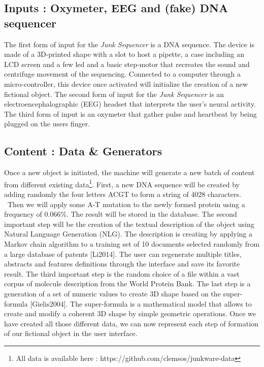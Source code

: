 \subsection[Inputs : Oxymeter, EEG and (fake) DNA sequencer]{Inputs :
Oxymeter, EEG and (fake) DNA sequencer}
The first form of input for the \textit{Junk Sequencer }is a DNA
sequence. The device is made of a 3D-printed shape with a slot to host
a pipette, a case including an LCD screen and a few led and a basic
step-motor that recreates the sound and centrifuge movement of the
sequencing. Connected to a computer through a micro-controller, this
device once activated will initialize the creation of a new fictional
object.\textit{ }The second form of input for the \textit{Junk
Sequencer }is an electroencephalographic (EEG) headset that interprets
the user{\textquoteright}s neural activity. The third form of input is
an oxymeter that gather pulse and heartbeat by being plugged on the
user{\textquotesingle}s finger.

\subsection[Content : Data \& Generators]{Content : Data \& Generators}
Once a new object is initiated, the machine will generate a new batch of
content from different existing data\footnote{All data is available
here : https://github.com/clemsos/junkware-data}. First, a new DNA
sequence will be created by adding randomly the four letters ACGT to
form a string of 4028 characters. \ Then we will apply some A-T
mutation to the newly formed protein using a frequency of 0.066\%. The
result will be stored in the database. The second important step will
be the creation of the textual description of the object using Natural
Language Generation (NLG). The description is creating by applying a
Markov chain algorithm to a training set of 10 documents selected
randomly from a large database of patents [Li2014]. The user can
regenerate multiple titles, abstracts and features definitions through
the interface and save its favorite result. The third important step is
the random choice of a file within a vast corpus of molecule
description from the World Protein Bank. The last step is a generation
of a set of numeric values to create 3D shape based on the
super-formula [Gielis2004]. The super-formula is a mathematical model
that allows to create and modify a coherent 3D shape by simple
geometric operations. Once we have created all those different data, we
can now represent each step of formation of our fictional object in the
user interface.


